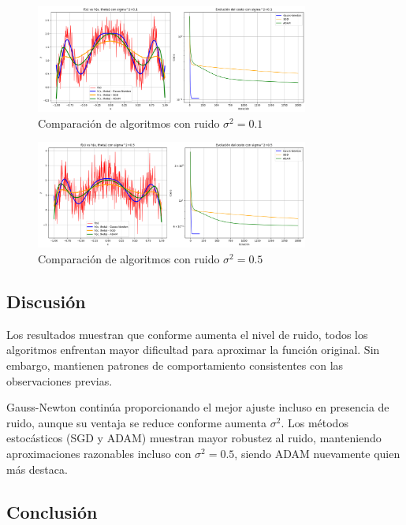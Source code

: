 \documentclass{article}
\begin{document}
\begin{figure}[H]
    \centering
    \includegraphics[width=0.8\textwidth]{images/6_sigma_1.png}
    \caption{Comparación de algoritmos con ruido $\sigma^2 = 0.1$}
    \label{fig:noise_01}
\end{figure}

\begin{figure}[H]
    \centering
    \includegraphics[width=0.8\textwidth]{images/6_sigma_5.png}
    \caption{Comparación de algoritmos con ruido $\sigma^2 = 0.5$}
    \label{fig:noise_05}
\end{figure}

\subsection{Discusión}

Los resultados muestran que conforme aumenta el nivel de ruido, todos los algoritmos enfrentan mayor dificultad para aproximar la función original. Sin embargo, mantienen patrones de comportamiento consistentes con las observaciones previas.

Gauss-Newton continúa proporcionando el mejor ajuste incluso en presencia de ruido, aunque su ventaja se reduce conforme aumenta $\sigma^2$. Los métodos estocásticos (SGD y ADAM) muestran mayor robustez al ruido, manteniendo aproximaciones razonables incluso con $\sigma^2 = 0.5$, siendo ADAM nuevamente quien más destaca.

\subsection{Conclusión}
\end{document}
